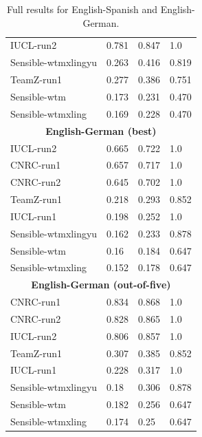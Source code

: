 \begin{table}[bt]
{{\begin{tabular}{llll}
IUCL-run2           & 0.781    & 0.847         & 1.0                 \\
Sensible-wtmxlingyu & 0.263    & 0.416         & 0.819\\
TeamZ-run1          & 0.277    & 0.386         & 0.751\\
Sensible-wtm        & 0.173    & 0.231         & 0.470 \\
Sensible-wtmxling   & 0.169    & 0.228         & 0.470 \\
\hline
\multicolumn{4}{|c|}{\textbf{English-German (best)}} \\
\hline
 IUCL-run2           & 0.665    & 0.722         & 1.0                 \\
 CNRC-run1           & 0.657    & 0.717         & 1.0                 \\
CNRC-run2           & 0.645    & 0.702         & 1.0                 \\
TeamZ-run1          & 0.218    & 0.293         & 0.852 \\
IUCL-run1           & 0.198    & 0.252         & 1.0                 \\
Sensible-wtmxlingyu & 0.162    & 0.233         & 0.878\\
Sensible-wtm        & 0.16     & 0.184         & 0.647\\
Sensible-wtmxling   & 0.152    & 0.178         & 0.647\\
\hline
\multicolumn{4}{|c|}{\textbf{English-German (out-of-five)}} \\
\hline
CNRC-run1           & 0.834    & 0.868         & 1.0                 \\
CNRC-run2           & 0.828    & 0.865         & 1.0                 \\
IUCL-run2           & 0.806    & 0.857         & 1.0                 \\
TeamZ-run1          & 0.307    & 0.385         & 0.852\\
IUCL-run1           & 0.228    & 0.317         & 1.0                 \\
Sensible-wtmxlingyu & 0.18     & 0.306         & 0.878\\
Sensible-wtm        & 0.182    & 0.256         & 0.647\\
Sensible-wtmxling   & 0.174    & 0.25          & 0.647\\
\hline
\end{tabular}}
\caption{Full results for English-Spanish and English-German.}
\label{tab:fullresults1}
}
\end{table}



